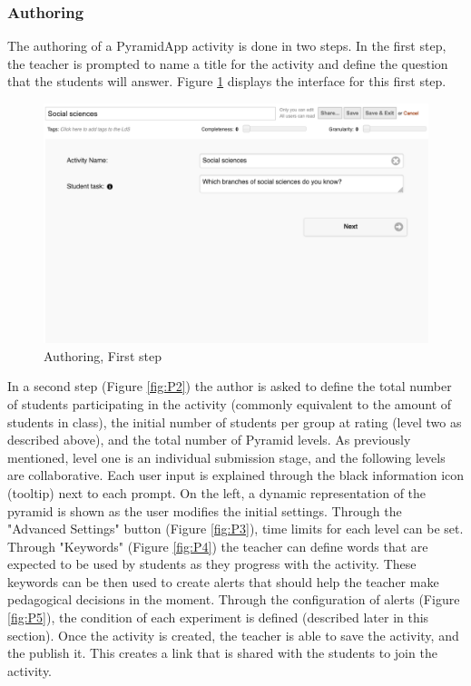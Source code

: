 \subsubsection{Authoring}
The authoring of a PyramidApp activity is done in two steps. In the first step, the teacher is prompted to name a title for the activity and define the question that the students will answer. Figure \ref{fig:P1} displays the interface for this first step.
\begin{figure}[!h]
    \includegraphics[clip,width=\columnwidth]{Figures/pyramidapp1.png}%
\caption{Authoring, First step}
\label{fig:P1}
\end{figure}
In a second step (Figure \ref{fig:P2}) the author is asked to define the total number of students participating in the activity (commonly equivalent to the amount of students in class), the initial number of students per group at rating (level two as described above), and the total number of Pyramid levels. As previously mentioned, level one is an individual submission stage, and the following levels are collaborative. Each user input is explained through the black information icon (tooltip) next to each prompt. On the left, a dynamic representation of the pyramid is shown as the user modifies the initial settings. Through the "Advanced Settings" button (Figure \ref{fig:P3}), time limits for each level can be set. Through "Keywords" (Figure \ref{fig:P4}) the teacher can define words that are expected to be used by students as they progress with the activity. These keywords can be then used to create alerts that should help the teacher make pedagogical decisions in the moment. Through the configuration of alerts (Figure \ref{fig:P5}), the condition of each experiment is defined (described later in this section). Once the activity is created, the teacher is able to save the activity, and the publish it. This creates a link that is shared with the students to join the activity.
